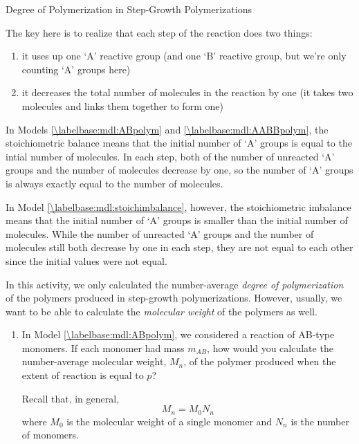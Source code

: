 \begin{activity}{Degree of Polymerization in Step-Growth Polymerizations}
\begin{exercises}
\begin{solution}{}
				The key here is to realize that each step of the reaction does two things:
				\begin{enumerate}
					\item it uses up one `A' reactive group (and one `B' reactive group, but we're only counting `A' groups here)
					\item it decreases the total number of molecules in the reaction by one (it takes two molecules and links them together to form one)
				\end{enumerate}
				In Models \ref{\labelbase:mdl:ABpolym} and \ref{\labelbase:mdl:AABBpolym}, the stoichiometric balance means that the initial number of `A' groups is equal to the intial number of molecules.
				In each step, both of the number of unreacted `A' groups and the number of molecules decrease by one, so the number of `A' groups is always exactly equal to the number of molecules.
				
				In Model \ref{\labelbase:mdl:stoichimbalance}, however, the stoichiometric imbalance means that the initial number of `A' groups is smaller than the initial number of molecules.
				While the number of unreacted `A' groups and the number of molecules still both decrease by one in each step, they are not equal to each other since the initial values were not equal.
				
			\end{solution}
	
		\exercise In this activity, we only calculated the number-average \emph{degree of polymerization} of the polymers produced in step-growth polymerizations. However, usually, we want to be able to calculate the \emph{molecular weight} of the polymers as well.
		
			\begin{enumerate}
			
				\item In Model \ref{\labelbase:mdl:ABpolym}, we considered a reaction of AB-type monomers.  If each monomer had mass $m_{AB}$, how would you calculate the number-average molecular weight, $M_n$, of the polymer produced when the extent of reaction is equal to $p$?
				
					\begin{solution}{}
						Recall that, in general,
						\begin{equation*}
							M_n = M_0 N_n
						\end{equation*}
						where $M_0$ is the molecular weight of a single monomer and $N_n$ is the number of monomers.
						

\end{solution}
\end{enumerate}
\end{exercises}
\end{activity}
